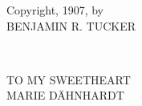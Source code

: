 \documentclass[12pt,a4paper]{book}
\begin{document}
\begin{center}
Copyright, 1907, by\\
BENJAMIN R. TUCKER
\end{center}

\newpage{}

~

\vspace{200pt}

\begin{center}
TO MY SWEETHEART\\
MARIE D\"AHNHARDT
\end{center}

\medskip{}

\setcounter{secnumdepth}{-1}






















\end{document}
